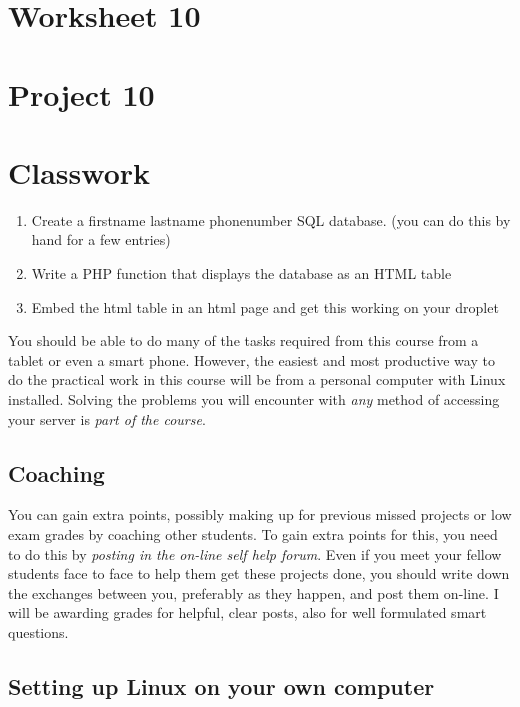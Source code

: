 \documentclass[12pt, a4paper]{article}
\begin{document}
\section*{Worksheet 10}
\section*{Project 10} 


\section*{Classwork}



\begin{enumerate}
 \item Create a firstname lastname phonenumber SQL database. (you can do this by hand for a few entries)
 \item Write a PHP function that displays the database as an HTML table
 \item Embed the html table in an html page and get this working on your droplet
\end{enumerate}

You should be able to do many of the tasks required from this course from a tablet or even a smart phone. However, the easiest and most productive way to do the practical work in this course will be from a personal computer with Linux installed. Solving the problems you will encounter with \emph{any} method of accessing your server is \emph{part of the course}.

\subsection*{Coaching}

You can gain extra points, possibly making up for previous missed projects or low exam grades by coaching other students. To gain extra points for this, you need to do this by \emph{posting in the on-line self help forum}. Even if you meet your fellow students face to face to help them get these projects done, you should write down the exchanges between you, preferably as they happen, and post them on-line. I will be awarding grades for helpful, clear posts, also for well formulated smart questions. 

\subsection*{Setting up Linux on your own computer}
\end{document}
